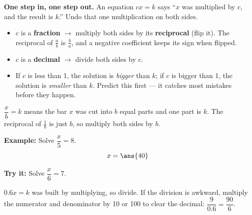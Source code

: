 \documentclass[12pt]{article}
\begin{document}

\begin{formulabox}
\textbf{One step in, one step out.} An equation $cx = k$ says ``$x$ was
multiplied by $c$, and the result is $k$.'' Undo that one multiplication on both
sides.
\begin{itemize}[leftmargin=0.9cm, itemsep=1pt, topsep=1pt]
\item $c$ is a \textbf{fraction} $\to$ multiply both sides by its
\textbf{reciprocal} (flip it). The reciprocal of $\frac{a}{b}$ is $\frac{b}{a}$,
and a negative coefficient keeps its sign when flipped.
\item $c$ is a \textbf{decimal} $\to$ divide both sides by $c$.
\item If $c$ is less than 1, the solution is \emph{bigger} than $k$; if $c$ is
bigger than 1, the solution is \emph{smaller} than $k$. Predict this first --- it
catches most mistakes before they happen.
\end{itemize}
\end{formulabox}


\begin{formulabox}
$\dfrac{x}{b} = k$ means the bar $x$ was cut into $b$ equal parts and one part is
$k$. The reciprocal of $\frac{1}{b}$ is just $b$, so multiply both sides by $b$.
\end{formulabox}

\begin{examplebox}
\textbf{Example:} Solve $\dfrac{x}{5} = 8$.
\[ x = \ans{40} \]
\end{examplebox}

\begin{tryitbox}
\textbf{Try it:} Solve $\dfrac{x}{6} = 7$.\\[2pt]
\end{tryitbox}


\begin{formulabox}
$0.6x = k$ was built by multiplying, so divide. If the division is awkward,
multiply the numerator and denominator by 10 or 100 to clear the decimal:
$\dfrac{9}{0.6} = \dfrac{90}{6}$.
\end{formulabox}
\end{document}
